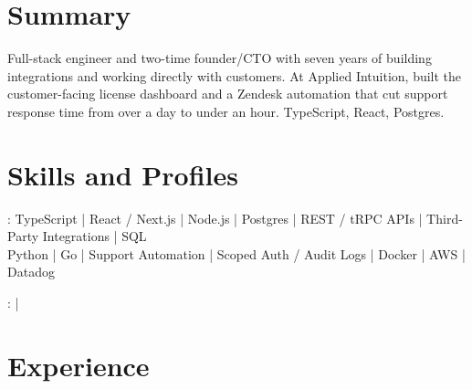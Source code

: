 \documentclass[print]{jack-resume}
\begin{document}
\pagecolor{darkmodeBackground}


\begin{minipage}[t][1cm][t]{.03\textwidth}
    \hfill
\end{minipage}

\section{Summary}
Full-stack engineer and two-time founder/CTO with seven years of building integrations and working directly with customers. At Applied Intuition, built the customer-facing license dashboard and a Zendesk automation that cut support response time from over a day to under an hour. TypeScript, React, Postgres.
\sectionsep

\section{Skills and Profiles}
:
TypeScript \hfill | \hfill
React / Next.js \hfill | \hfill
Node.js \hfill | \hfill
Postgres \hfill | \hfill
REST / tRPC APIs \hfill | \hfill
Third-Party Integrations \hfill | \hfill
SQL \\
\hspace{1.0cm} Python \hfill | \hfill
Go \hfill | \hfill
Support Automation \hfill | \hfill
Scoped Auth / Audit Logs \hfill | \hfill
Docker \hfill | \hfill
AWS \hfill | \hfill
Datadog \\

\raggedright{
    :
      \href{https://www.linkedin.com/in/jack-sturtevant/}{ \ExternalLink} |
     \href{https://github.com/jacksturt}{ \ExternalLink}}

\section{Experience}
\end{document}
